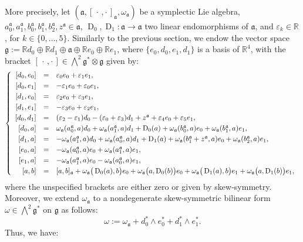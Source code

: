 \documentclass[final,1p,times,nopreprintline]{elsarticle}
\theoremstyle{definition}
\numberwithin{equation}{section}
\newcommand{\rel}{\mathbb{R}}
\newcommand{\w}{\omega}
\newcommand{\g}{\mathfrak{g}}
\newcommand{\ai}{\mathfrak{a}}
\numberwithin{equation}{section}
\newcommand{\D}{\operatorname{D}}
\newcommand{\cro}{[\,\cdot\,,\cdot\,]}
\begin{document}
More precisely, let $(\ai,[\,\cdot\,,\cdot\,]_\ai,\w_\ai)$ be a symplectic Lie algebra, $a^\ai_0,a^\ai_1,b^\ai_0,b^\ai_1,b_2^\ai,z^\ai\in\ai$, $\D_0,\D_1:\ai\to\ai$ two linear endomorphisms of $\ai$, and $\varepsilon_k\in\rel$, for $k\in\{0,\ldots,5\}$. Similarly to the previous section, we endow the vector space $\g:=\rel d_0\oplus\rel d_1\oplus\ai\oplus\rel e_0\oplus\rel e_1$, where $\{e_0,d_0,e_1,d_1\}$ is a basis of $\rel^4$, with the bracket $\cro\in\bigwedge^2\g^*\otimes\g$ given by:
\begin{equation*}\label{LiBraDobExIdeDim2Prop0}
	\left\{
	\begin{array}{r c l}\vspace{1mm}
		\left[d_0,e_0\right]&=&\varepsilon_0e_0+\varepsilon_1e_1,\\\vspace{1mm}
		\left[d_0,e_1\right]&=&-\varepsilon_1e_0+\varepsilon_0e_1,\\\vspace{1mm}
		\left[d_1,e_0\right]&=&\varepsilon_2e_0+\varepsilon_3e_1,\\\vspace{1mm}
		\left[d_1,e_1\right]&=&-\varepsilon_3e_0+\varepsilon_2e_1,\\\vspace{1mm}
		\left[d_0,d_1\right]&=&(\varepsilon_2-\varepsilon_1)d_0-(\varepsilon_0+\varepsilon_3)d_1+z^\ai+\varepsilon_4e_0+\varepsilon_5e_1,\\\vspace{1mm}
		\left[d_0,a\right]&=&\w_\ai(a^\ai_0,a)d_0+\w_\ai(a^\ai_1,a)d_1+\D_0(a)+\w_\ai(b^\ai_0,a)e_0+\w_\ai(b^\ai_1,a)e_1,\\\vspace{1mm}
		\left[d_1,a\right]&=&-\w_\ai(a^\ai_1,a)d_0+\w_\ai(a^\ai_0,a)d_1+\D_1(a)+\w_\ai(b^\ai_1+z^\ai,a)e_0+\w_\ai(b^\ai_2,a)e_1,\\\vspace{1mm}
		\left[e_0,a\right]&=&-\w_\ai(a^\ai_0,a)e_0+\w_\ai(a^\ai_1,a)e_1,\hfill\\\vspace{1mm}
		\left[e_1,a\right]&=&-\w_\ai(a^\ai_1,a)e_0-\w_\ai(a^\ai_0,a)e_1,\hfill\\
		\left[a,b\right]&=&[a,b]_\ai+\w_\ai\big(\D_0(a),b\big)e_0+\w_\ai\big(a,\D_0(b)\big)e_0+\w_\ai\big(\D_1(a),b\big)e_1+\w_\ai\big(a,\D_1(b)\big)e_1,\hfill
	\end{array}
	\right.\\
\end{equation*}
where the unspecified brackets are either zero or given by skew-symmetry. Moreover, we  extend $\w_\ai$ to a nondegenerate skew-symmetric bilinear form $\w\in\bigwedge^2\g^*$ on $\g$ as follows: $$\w:=\w_\ai+d_0^*\wedge e_0^*+d_1^*\wedge e_1^*.$$
Thus, we have:
\end{document}
